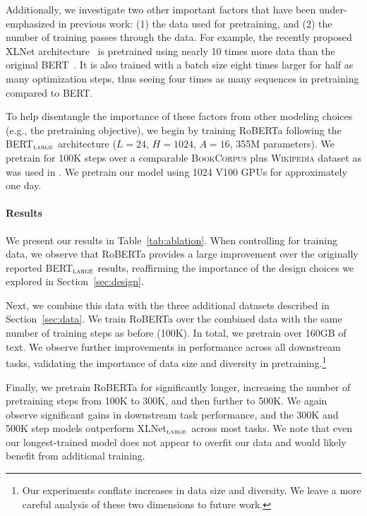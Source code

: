 Additionally, we investigate two other important factors that have been under-emphasized in previous work: (1) the data used for pretraining, and (2) the number of training passes through the data. For example, the recently proposed XLNet architecture~\cite{yang2019xlnet} is pretrained using nearly 10 times more data than the original BERT~\cite{devlin2018bert}. It is also trained with a batch size eight times larger for half as many optimization steps, thus seeing four times as many sequences in pretraining compared to BERT.

To help disentangle the importance of these factors from other modeling choices (e.g., the pretraining objective), we begin by training RoBERTa following the BERT$_{\textsc{large}}$ architecture ($L=24$, $H=1024$, $A=16$, 355M parameters). We pretrain for 100K steps over a comparable \textsc{BookCorpus} plus \textsc{Wikipedia} dataset as was used in .
We pretrain our model using 1024 V100 GPUs for approximately one day.

\paragraph{Results}

We present our results in Table~\ref{tab:ablation}.
When controlling for training data, we observe that RoBERTa provides a large improvement over the originally reported BERT$_{\textsc{large}}$ results, reaffirming the importance of the design choices we explored in Section~\ref{sec:design}.

Next, we combine this data with the three additional datasets described in Section~\ref{sec:data}.
We train RoBERTa over the combined data with the same number of training steps as before (100K). In total, we pretrain over 160GB of text. We observe further improvements in performance across all downstream tasks, validating the importance of data size and diversity in pretraining.\footnote{Our experiments conflate increases in data size and diversity. We leave a more careful analysis of these two dimensions to future work.}

Finally, we pretrain RoBERTa for significantly longer, increasing the number of pretraining steps from 100K to 300K, and then further to 500K. We again observe significant gains in downstream task performance, and the 300K and 500K step models outperform XLNet$_{\textsc{large}}$ across most tasks. We note that even our longest-trained model does not appear to overfit our data and would likely benefit from additional training.

